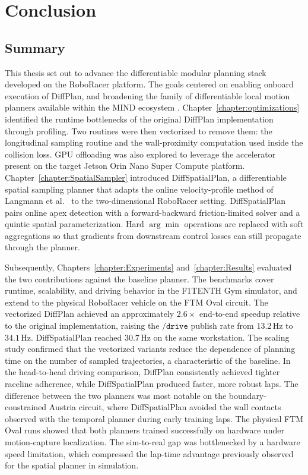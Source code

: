 \chapter{Conclusion}
\label{chapter:Conclusion}

\section{Summary}
\label{section:ConclusionSummary}

This thesis set out to advance the differentiable modular planning stack developed on the RoboRacer platform.
The goals centered on enabling onboard execution of DiffPlan, and broadening the family of differentiable local motion planners available within the MIND ecosystem \cite{jahncke_MINDStackModularInterpretable_2025, swadiryus_DifferentiableMotionPlanning_2025, koch_DifferentiableInterpretablePath_2025}.
Chapter~\ref{chapter:optimizations} identified the runtime bottlenecks of the original DiffPlan implementation through profiling.
Two routines were then vectorized to remove them: the longitudinal sampling routine and the wall-proximity computation used inside the collision loss.
GPU offloading was also explored to leverage the accelerator present on the target Jetson Orin Nano Super Compute platform.
Chapter~\ref{chapter:SpatialSampler} introduced DiffSpatialPlan, a differentiable spatial sampling planner that adapts the online velocity-profile method of Langmann et al.\ \cite{langmann_OnlineVelocityProfile_2025} to the two-dimensional RoboRacer setting.
DiffSpatialPlan pairs online apex detection with a forward-backward friction-limited solver and a quintic spatial parameterization.
Hard $\arg\min$ operations are replaced with soft aggregations so that gradients from downstream control losses can still propagate through the planner.

Subsequently, Chapters~\ref{chapter:Experiments} and~\ref{chapter:Results} evaluated the two contributions against the baseline planner.
The benchmarks cover runtime, scalability, and driving behavior in the F1TENTH Gym simulator, and extend to the physical RoboRacer vehicle on the FTM Oval circuit.
The vectorized DiffPlan achieved an approximately $2.6\times$ end-to-end speedup relative to the original implementation, raising the $\texttt{/drive}$ publish rate from $13.2$\,Hz to $34.1$\,Hz.
DiffSpatialPlan reached $30.7$\,Hz on the same workstation.
The scaling study confirmed that the vectorized variants reduce the dependence of planning time on the number of sampled trajectories, a characteristic of the baseline.
In the head-to-head driving comparison, DiffPlan consistently achieved tighter raceline adherence, while DiffSpatialPlan produced faster, more robust laps.
The difference between the two planners was most notable on the boundary-constrained Austria circuit, where DiffSpatialPlan avoided the wall contacts observed with the temporal planner during early training laps.
The physical FTM Oval runs showed that both planners trained successfully on hardware under motion-capture localization.
The sim-to-real gap was bottlenecked by a hardware speed limitation, which compressed the lap-time advantage previously observed for the spatial planner in simulation.

